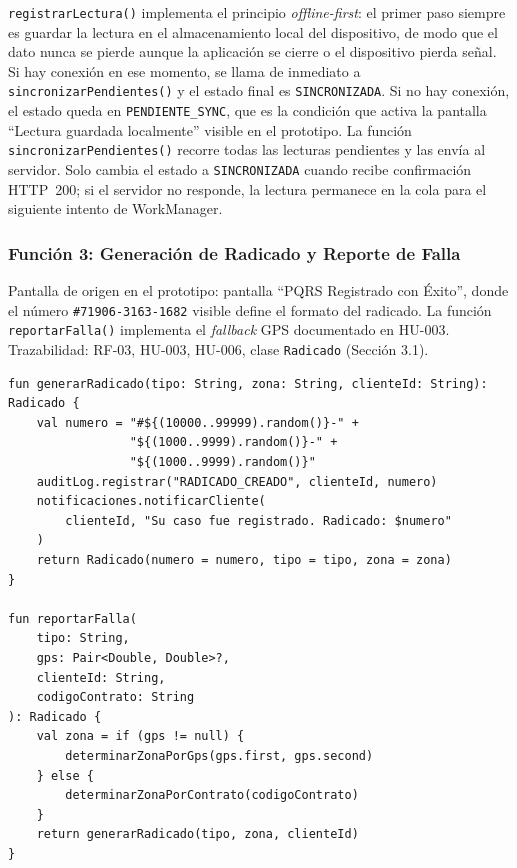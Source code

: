 \documentclass[12pt, a4paper]{article}
\begin{document}
\noindent \texttt{registrarLectura()} implementa el principio \textit{offline-first}: el primer paso siempre es guardar la lectura en el almacenamiento local del dispositivo, de modo que el dato nunca se pierde aunque la aplicación se cierre o el dispositivo pierda señal. Si hay conexión en ese momento, se llama de inmediato a \texttt{sincronizarPendientes()} y el estado final es \texttt{SINCRONIZADA}. Si no hay conexión, el estado queda en \texttt{PENDIENTE\_SYNC}, que es la condición que activa la pantalla ``Lectura guardada localmente'' visible en el prototipo. La función \texttt{sincronizarPendientes()} recorre todas las lecturas pendientes y las envía al servidor. Solo cambia el estado a \texttt{SINCRONIZADA} cuando recibe confirmación HTTP~200; si el servidor no responde, la lectura permanece en la cola para el siguiente intento de WorkManager.

\clearpage
\subsubsection{Función 3: Generación de Radicado y Reporte de Falla}

\noindent Pantalla de origen en el prototipo: pantalla ``PQRS Registrado con Éxito'', donde el número \texttt{\#71906-3163-1682} visible define el formato del radicado. La función \texttt{reportarFalla()} implementa el \textit{fallback} GPS documentado en HU-003. Trazabilidad: RF-03, HU-003, HU-006, clase \texttt{Radicado} (Sección 3.1).

\begin{lstlisting}[caption={RadicadoService.kt -- Funciones generarRadicado() y reportarFalla()}]
fun generarRadicado(tipo: String, zona: String, clienteId: String): Radicado {
    val numero = "#${(10000..99999).random()}-" +
                 "${(1000..9999).random()}-" +
                 "${(1000..9999).random()}"
    auditLog.registrar("RADICADO_CREADO", clienteId, numero)
    notificaciones.notificarCliente(
        clienteId, "Su caso fue registrado. Radicado: $numero"
    )
    return Radicado(numero = numero, tipo = tipo, zona = zona)
}

fun reportarFalla(
    tipo: String,
    gps: Pair<Double, Double>?,
    clienteId: String,
    codigoContrato: String
): Radicado {
    val zona = if (gps != null) {
        determinarZonaPorGps(gps.first, gps.second)
    } else {
        determinarZonaPorContrato(codigoContrato)
    }
    return generarRadicado(tipo, zona, clienteId)
}
\end{lstlisting}
\end{document}
